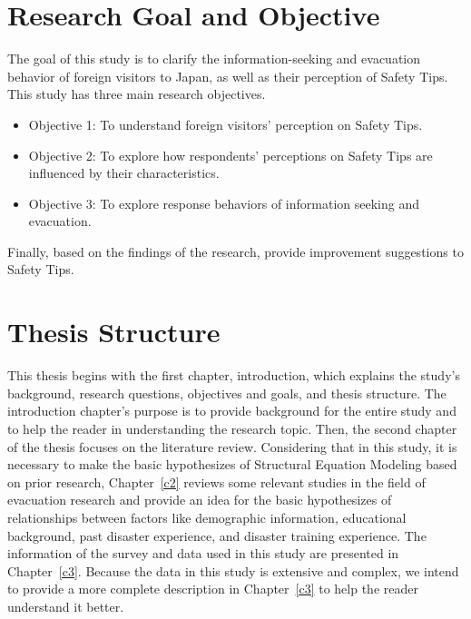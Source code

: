 \section{Research Goal and Objective}
The goal of this study is to clarify the information-seeking and evacuation behavior of foreign visitors to Japan, as well as their perception of Safety Tips. This study has three main research objectives. 

\begin{itemize}
\item Objective 1: To understand foreign visitors' perception on Safety Tips.
\item Objective 2: To explore how respondents' perceptions on Safety Tips are influenced by their characteristics.
\item Objective 3: To explore response behaviors of information seeking and evacuation.
\end{itemize}

Finally, based on the findings of the research, provide improvement suggestions to Safety Tips.


\section{Thesis Structure} 

This thesis begins with the first chapter, introduction, which explains the study's background, research questions, objectives and goals, and thesis structure. The introduction chapter's purpose is to provide background for the entire study and to help the reader in understanding the research topic. Then, the second chapter of the thesis focuses on the literature review. Considering that in this study, it is necessary to make the basic hypothesizes of Structural Equation Modeling based on prior research, Chapter~\ref{c2} reviews some relevant studies in the field of evacuation research and provide an idea for the basic hypothesizes of relationships between factors like demographic information, educational background, past disaster experience, and disaster training experience. The information of the survey and data used in this study are presented in Chapter~\ref{c3}. Because the data in this study is extensive and complex, we intend to provide a more complete description in Chapter~\ref{c3} to help the reader understand it better. 

